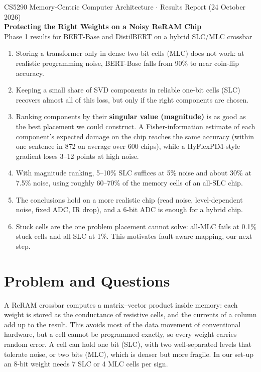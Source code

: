 \documentclass[10pt,a4paper]{article}
\begin{document}
\begin{center}
{\small CS5290 Memory-Centric Computer Architecture $\cdot$ Results Report (24 October 2026)}\\[6pt]
{\LARGE\bfseries Protecting the Right Weights on a Noisy ReRAM Chip}\\[6pt]
{\large Phase 1 results for BERT-Base and DistilBERT on a hybrid SLC/MLC crossbar}
\end{center}

\begin{tcolorbox}[colback=keybg,colframe=accent,boxrule=0.5pt,arc=1pt,left=6pt,right=6pt,top=4pt,bottom=4pt,
  title={Main findings},fonttitle=\bfseries\small,coltitle=white]
\begin{enumerate}[leftmargin=*]
\item Storing a transformer only in dense two-bit cells (MLC) does not work: at realistic programming
noise, BERT-Base falls from 90\% to near coin-flip accuracy.
\item Keeping a small share of SVD components in reliable one-bit cells (SLC) recovers almost all of this
loss, but only if the right components are chosen.
\item Ranking components by their \textbf{singular value (magnitude)} is as good as the best placement we
could construct. A Fisher-information estimate of each component's expected damage on the chip reaches
the same accuracy (within one sentence in 872 on average over 600 chips), while a HyFlexPIM-style gradient
loses 3--12 points at high noise.
\item With magnitude ranking, 5--10\% SLC suffices at 5\% noise and about 30\% at 7.5\% noise, using
roughly 60--70\% of the memory cells of an all-SLC chip.
\item The conclusions hold on a more realistic chip (read noise, level-dependent noise, fixed ADC, IR drop),
and a 6-bit ADC is enough for a hybrid chip.
\item Stuck cells are the one problem placement cannot solve: all-MLC fails at 0.1\% stuck cells and
all-SLC at 1\%. This motivates fault-aware mapping, our next step.
\end{enumerate}
\end{tcolorbox}

\section{Problem and Questions}
A ReRAM crossbar computes a matrix--vector product inside memory: each weight is stored as the
conductance of resistive cells, and the currents of a column add up to the result. This avoids most of the
data movement of conventional hardware, but a cell cannot be programmed exactly, so every weight carries
random error. A cell can hold one bit (SLC), with two well-separated levels that tolerate noise, or two
bits (MLC), which is denser but more fragile. In our set-up an 8-bit weight needs 7 SLC or 4 MLC cells per
sign.
\end{document}
